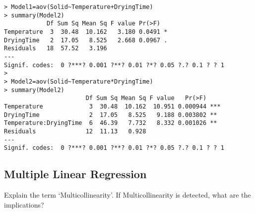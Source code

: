 \documentclass[a4paper,12pt]{article}
\begin{document}
\newpage
\begin{verbatim}
> Model1=aov(Solid~Temperature+DryingTime)
> summary(Model2)
            Df Sum Sq Mean Sq F value Pr(>F)  
Temperature  3  30.48  10.162   3.180 0.0491 *
DryingTime   2  17.05   8.525   2.668 0.0967 .
Residuals   18  57.52   3.196                 
---
Signif. codes:  0 ?***? 0.001 ?**? 0.01 ?*? 0.05 ?.? 0.1 ? ? 1 
> 
> Model2=aov(Solid~Temperature*DryingTime)
> summary(Model2)
                       Df Sum Sq Mean Sq F value   Pr(>F)    
Temperature             3  30.48  10.162  10.951 0.000944 ***
DryingTime              2  17.05   8.525   9.188 0.003802 ** 
Temperature:DryingTime  6  46.39   7.732   8.332 0.001026 ** 
Residuals              12  11.13   0.928                     
---
Signif. codes:  0 ?***? 0.001 ?**? 0.01 ?*? 0.05 ?.? 0.1 ? ? 1 
\end{verbatim}

\subsection{Multiple Linear Regression}
Explain the term `Multicollinearity'. If Multicollinearity is detected, what are the implications?
\end{document}

